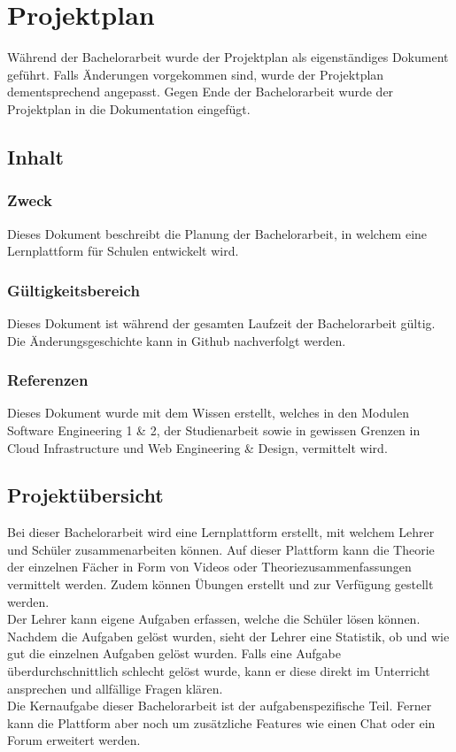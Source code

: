 \section{Projektplan}
Während der Bachelorarbeit wurde der Projektplan als eigenständiges Dokument geführt. Falls Änderungen vorgekommen sind, wurde der Projektplan dementsprechend angepasst. Gegen Ende der Bachelorarbeit wurde der Projektplan in die Dokumentation eingefügt.

\subsection{Inhalt}
\subsubsection*{Zweck}
Dieses Dokument beschreibt die Planung der Bachelorarbeit, in welchem eine Lernplattform für Schulen entwickelt wird.

\subsubsection*{Gültigkeitsbereich}
Dieses Dokument ist während der gesamten Laufzeit der Bachelorarbeit gültig. Die Änderungsgeschichte kann in Github nachverfolgt werden.

\subsubsection*{Referenzen}
Dieses Dokument wurde mit dem Wissen erstellt, welches in den Modulen Software Engineering 1 \& 2, der Studienarbeit sowie in gewissen Grenzen in Cloud Infrastructure und Web Engineering \& Design, vermittelt wird.



\subsection{Projektübersicht}
Bei dieser Bachelorarbeit wird eine Lernplattform erstellt, mit welchem Lehrer und Schüler zusammenarbeiten können. Auf dieser Plattform kann die Theorie der einzelnen Fächer in Form von Videos oder Theoriezusammenfassungen vermittelt werden. Zudem können Übungen erstellt und zur Verfügung gestellt werden. \\
Der Lehrer kann eigene Aufgaben erfassen, welche die Schüler lösen können. Nachdem die Aufgaben gelöst wurden, sieht der Lehrer eine Statistik, ob und wie gut die einzelnen Aufgaben gelöst wurden. Falls eine Aufgabe überdurchschnittlich schlecht gelöst wurde, kann er diese direkt im Unterricht ansprechen und allfällige Fragen klären. \\
Die Kernaufgabe dieser Bachelorarbeit ist der aufgabenspezifische Teil. Ferner kann die Plattform aber noch um zusätzliche Features wie einen Chat oder ein Forum erweitert werden.


